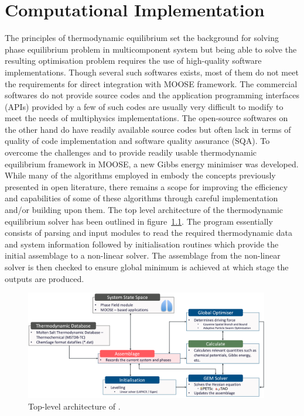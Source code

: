 \chapter{Computational Implementation} \label{chap:implementation}

	The principles of thermodynamic equilibrium set the background for solving phase equilibrium problem in multicomponent system but being able to solve the resulting optimisation problem requires the use of high-quality software implementations. Though several such softwares exists, most of them do not meet the requirements for direct integration with MOOSE framework. The commercial softwares do not provide source codes and the application programming interfaces (APIs) provided by a few of such codes are usually very difficult to modify to meet the needs of multiphysics implementations. The open-source softwares on the other hand do have readily available source codes but often lack in terms of quality of code implementation and software quality assurance (SQA). To overcome the challenges and to provide readily usable thermodynamic equilibrium framework in MOOSE, a new Gibbs energy minimiser was developed.  While many of the algorithms employed in {\GEM} embody the concepts previously presented in open literature, there remains a scope for improving the efficiency and capabilities of some of these algorithms through careful implementation and/or building upon them. The top level architecture of the thermodynamic equilibrium solver has been outlined in figure~\ref{fig:structure}. The program essentially consists of parsing and input modules to read the required thermodynamic data and system information followed by initialisation routines which provide the initial assemblage to a non-linear solver. The assemblage from the non-linear solver is then checked to ensure global minimum is achieved at which stage the outputs are produced.
	\begin{figure}[htbp]
	 	\centering
	   	\includegraphics[width=0.95\textwidth]{figures/chapter-6/YJ_structure.png}
	   	\caption{Top-level architecture of \GEM.}
	   	\label{fig:structure}
	\end{figure}


